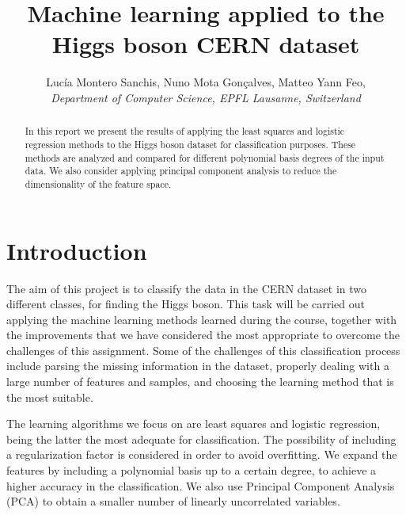 \documentclass[10pt,conference,compsocconf]{IEEEtran}
\begin{document}
\title{Machine learning applied to the Higgs boson CERN dataset}

\author{
  Luc\'{i}a Montero Sanchis, Nuno Mota Gon\c{c}alves, Matteo Yann Feo,  \\
  \textit{Department of Computer Science, EPFL Lausanne, Switzerland}
}

\maketitle

\begin{abstract}
  In this report we present the results of applying the least squares and logistic regression methods to the Higgs boson dataset for classification purposes. These methods are analyzed and compared for different polynomial basis degrees of the input data. We also consider applying principal component analysis to reduce the dimensionality of the feature space.
\end{abstract}

\section{Introduction}
	The aim of this project is to classify the data in the CERN dataset in two different classes, for finding the Higgs boson. This task will be carried out applying the machine learning methods learned during the course, together with the improvements that we have considered the most appropriate to overcome the challenges of this assignment. Some of the challenges of this classification process include parsing the missing information in the dataset, properly dealing with a large number of features and samples, and choosing the learning method that is the most suitable.

	The learning algorithms we focus on are least squares and logistic regression, being the latter the most adequate for classification. The possibility of including a regularization factor is considered in order to avoid overfitting. We expand the features by including a polynomial basis up to a certain degree, to achieve a higher accuracy in the classification. We also use Principal Component Analysis (PCA) to obtain a smaller number of linearly uncorrelated variables.

\end{document}
